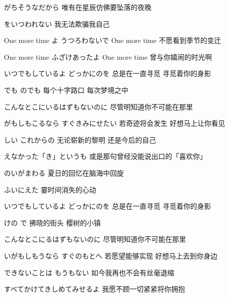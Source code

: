 \documentclass[12pt]{article}
\begin{document}
{がちそうなだから
\hfill {\small
唯有在星辰仿佛要坠落的夜晚 }

をいつわれない
\hfill {\small
我无法欺骗我自己 }

One more time よ うつろわないで
\hfill {\small
One more time 不愿看到季节的变迁 }

One more time ふざけあったよ
\hfill {\small
One more time 曾与你嬉闹的时光啊 }

\item
いつでもしているよ どっかにのを
\hfill {\small
总是在一直寻觅 寻觅着你的身影 }

でも のでも
\hfill {\small
每个十字路口 每次梦境之中 }

こんなとこにいるはずもないのに
\hfill {\small
尽管明知道你不可能在那里 }

がもしもこるなら すぐきみにせたい
\hfill {\small
若奇迹将会发生 好想马上让你看见 }

しい これからの
\hfill {\small
无论崭新的黎明 还是今后的自己 }

えなかった「き」というも
\hfill {\small
或是那句曾经没能说出口的「喜欢你」 }

\item
{}のいがまわる
\hfill {\small
夏日的回忆在脑海中回旋 }

ふいにえた
\hfill {\small
霎时间消失的心动 }

\item
いつでもしているよ どっかにのを
\hfill {\small
总是在一直寻觅 寻觅着你的身影 }

けの で
\hfill {\small
拂晓的街头 樱树的小镇 }

こんなとこにるはずもないのに
\hfill {\small
尽管明知道你不可能在那里 }

いがもしもうなら すぐのもとへ
\hfill {\small
若愿望能够实现 好想马上去到你身边 }

できないことは もうもない
\hfill {\small
如今我再也不会有丝毫退缩 }

すべてかけてきしめてみせるよ
\hfill {\small
我愿不顾一切紧紧将你拥抱 }

}
\end{document}
